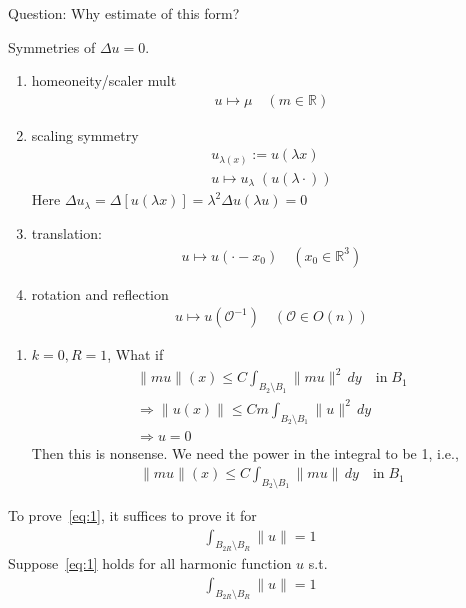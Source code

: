 \documentclass[11pt]{article}
\begin{document}
Question: Why estimate of this form?

Symmetries of $\Delta u = 0$. 

\begin{enumerate}
    \item homeoneity/scaler mult
    \begin{align*}
        u \mapsto \mu \quad (m \in \mathbb{R})
    \end{align*}
    \item scaling symmetry
    \begin{align*}
        u_{\lambda (x)} := u(\lambda x)\\
        u \mapsto u_{\lambda} \; (u(\lambda\cdot ))
    \end{align*}
    Here $\Delta u_{\lambda} = \Delta[u(\lambda x)] = \lambda^2 \Delta u (\lambda u)=0$
    \item translation:
    \begin{align*}
        u \mapsto u(\cdot -x_{0}) \quad (x_{0} \in \mathbb{R}^3)
    \end{align*}
    \item rotation and reflection
    \begin{align*}
        u \mapsto u(\mathcal{O}^{-1}) \quad (\mathcal{O} \in O(n))
    \end{align*}
\end{enumerate}

\begin{enumerate}
    \item $k=0, R=1$, What if
    \begin{align*}
        \|m u \| (x) \le C \int_{B_2 \setminus B_1} \| m u \| ^2 \, dy \quad 
        \text{in} \; B_1\\
        \Longrightarrow \| u(x) \| \le Cm \int_{B_2 \setminus B_1} \| u \| ^2 \, dy\\
        \Longrightarrow u = 0
    \end{align*}
    Then this is nonsense. We need the power in the integral to be 1, i.e., 
    \begin{align*}
        \|m u \| (x) \le C \int_{B_2 \setminus B_1} \| m u \|  \, dy \quad 
        \text{in} \; B_1
    \end{align*}
\end{enumerate}
To prove~\eqref{eq:1}, it suffices to prove it for
\begin{align*}
    \int _{B_{2R}\setminus B_{R}} \| u \| = 1
\end{align*}
Suppose~\eqref{eq:1} holds for all harmonic function $u$ s.t.
\begin{align*}
    \int _{B_{2R}\setminus B_{R}} \| u \| = 1
\end{align*}
\end{document}
